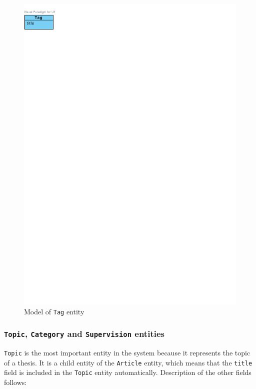 \begin{figure}[h]
    \centering
        \includegraphics[trim=0 770 510 30, clip, keepaspectratio]{./images/domain-tag-entity.pdf}
    \caption{Model of \texttt{Tag} entity}
    \label{fig:domain-tag-entity}
\end{figure}

\subsubsection{\textbf{\texttt{Topic}, \texttt{Category} and \texttt{Supervision} entities}}

\texttt{Topic} is the most important entity in the system because it represents the topic of a thesis. It is a child entity of the \texttt{Article} entity, which means that the \texttt{title} field is included in the \texttt{Topic} entity automatically. Description of the other fields follows:

